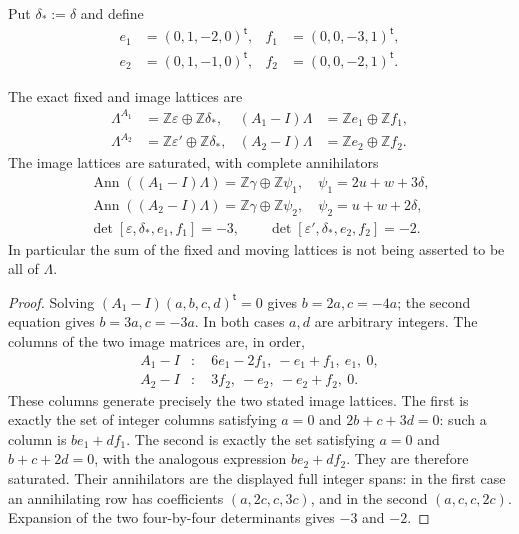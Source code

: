 Put $\delta_*:=\widehat\delta$ and define
\[
\begin{aligned}
 e_1&=(0,1,-2,0)^{\mathsf t},&f_1&=(0,0,-3,1)^{\mathsf t},\\
 e_2&=(0,1,-1,0)^{\mathsf t},&f_2&=(0,0,-2,1)^{\mathsf t}.
\end{aligned}
\tag{FF6}\label{ffcert:eq:moving-generators}
\]

\begin{proposition}
\label{ffcert:prop:integral-summands}
The exact fixed and image lattices are
\[
\begin{aligned}
 \Lambda^{A_1}&=\mathbb Z\varepsilon\oplus\mathbb Z\delta_*,&
 (A_1-I)\Lambda&=\mathbb Ze_1\oplus\mathbb Zf_1,\\
 \Lambda^{A_2}&=\mathbb Z\varepsilon'\oplus\mathbb Z\delta_*,&
 (A_2-I)\Lambda&=\mathbb Ze_2\oplus\mathbb Zf_2.
\end{aligned}
\tag{FF7}\label{ffcert:eq:integral-summands}
\]
The image lattices are saturated, with complete annihilators
\[
\begin{gathered}
 \operatorname{Ann}((A_1-I)\Lambda)
 =\mathbb Z\gamma\oplus\mathbb Z\psi_1,
 \quad \psi_1=2u+w+3\delta,\\
 \operatorname{Ann}((A_2-I)\Lambda)
 =\mathbb Z\gamma\oplus\mathbb Z\psi_2,
 \quad \psi_2=u+w+2\delta,\\
 \det[\varepsilon,\delta_*,e_1,f_1]=-3,
 \qquad \det[\varepsilon',\delta_*,e_2,f_2]=-2.
\end{gathered}
\tag{FF8}\label{ffcert:eq:annihilators-indices}
\]
In particular the sum of the fixed and moving lattices is not being
asserted to be all of $\Lambda$.
\end{proposition}

\begin{proof}
Solving $(A_1-I)(a,b,c,d)^{\mathsf t}=0$ gives $b=2a,c=-4a$;
the second equation gives $b=3a,c=-3a$. In both cases $a,d$ are arbitrary
integers. The columns of the two image matrices are, in order,
\[
 \begin{aligned}
 A_1-I &: \quad 6e_1-2f_1,\ -e_1+f_1,\ e_1,\ 0,\\
 A_2-I &: \quad 3f_2,\ -e_2,\ -e_2+f_2,\ 0.
 \end{aligned}
 \tag{FF9}\label{ffcert:eq:image-columns}
\]
These columns generate precisely the two stated image lattices. The first
is exactly the set of integer columns satisfying $a=0$ and
$2b+c+3d=0$: such a column is $be_1+df_1$. The second is exactly
the set satisfying $a=0$ and $b+c+2d=0$, with the analogous expression
$be_2+df_2$. They are therefore saturated. Their annihilators are the
displayed full integer spans: in the first case an annihilating row has
coefficients $(a,2c,c,3c)$, and in the second $(a,c,c,2c)$.
Expansion of the two four-by-four determinants gives $-3$ and $-2$.
\end{proof}

